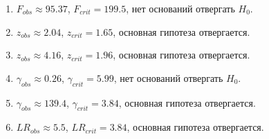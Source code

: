 \documentclass[12pt]{article}
\begin{document}
\begin{enumerate}
\item $F_{obs} \approx 95.37$, $F_{crit} = 199.5$, нет оснований отвергать $H_0$.
\item $z_{obs} \approx 2.04$, $z_{crit} = 1.65$, основная гипотеза отвергается.
\item $z_{obs} \approx 4.16$, $z_{crit} = 1.96$, основная гипотеза отвергается.
\item $\gamma_{obs} \approx 0.26$, $\gamma_{crit} = 5.99$, нет оснований отвергать $H_0$.
\item $\gamma_{obs} \approx 139.4$, $\gamma_{crit} = 3.84$, основная гипотеза отвергается.
\item $LR_{obs} \approx 5.5$, $LR_{crit} = 3.84$, основная гипотеза отвергается.
\end{enumerate}
\end{document}
